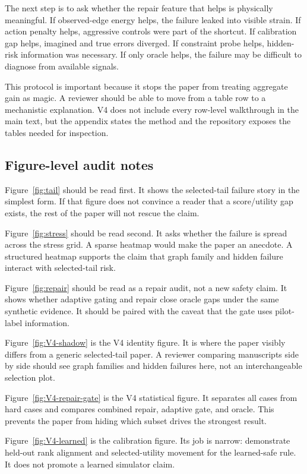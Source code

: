 \documentclass{article}
\begin{document}
The next step is to ask whether the repair feature that helps is physically
meaningful.  If observed-edge energy helps, the failure leaked into visible
strain.  If action penalty helps, aggressive controls were part of the shortcut.
If calibration gap helps, imagined and true errors diverged.  If constraint
probe helps, hidden-risk information was necessary.  If only oracle helps, the
failure may be difficult to diagnose from available signals.

This protocol is important because it stops the paper from treating aggregate
gain as magic.  A reviewer should be able to move from a table row to a
mechanistic explanation.  V4 does not include every row-level walkthrough in the
main text, but the appendix states the method and the repository exposes the
tables needed for inspection.

\subsection{Figure-level audit notes}

Figure~\ref{fig:tail} should be read first.  It shows the selected-tail failure
story in the simplest form.  If that figure does not convince a reader that a
score/utility gap exists, the rest of the paper will not rescue the claim.

Figure~\ref{fig:stress} should be read second.  It asks whether the failure is
spread across the stress grid.  A sparse heatmap would make the paper an
anecdote.  A structured heatmap supports the claim that graph family and hidden
failure interact with selected-tail risk.

Figure~\ref{fig:repair} should be read as a repair audit, not a new safety
claim.  It shows whether adaptive gating and repair close oracle gaps under the
same synthetic evidence.  It should be paired with the caveat that the gate uses
pilot-label information.

Figure~\ref{fig:V4-shadow} is the V4 identity figure.  It is where the paper
visibly differs from a generic selected-tail paper.  A reviewer comparing
manuscripts side by side should see graph families and hidden failures here, not
an interchangeable selection plot.

Figure~\ref{fig:V4-repair-gate} is the V4 statistical figure.  It separates all
cases from hard cases and compares combined repair, adaptive gate, and oracle.
This prevents the paper from hiding which subset drives the strongest result.

Figure~\ref{fig:V4-learned} is the calibration figure.  Its job is narrow:
demonstrate held-out rank alignment and selected-utility movement for the
learned-safe rule.  It does not promote a learned simulator claim.
\end{document}
